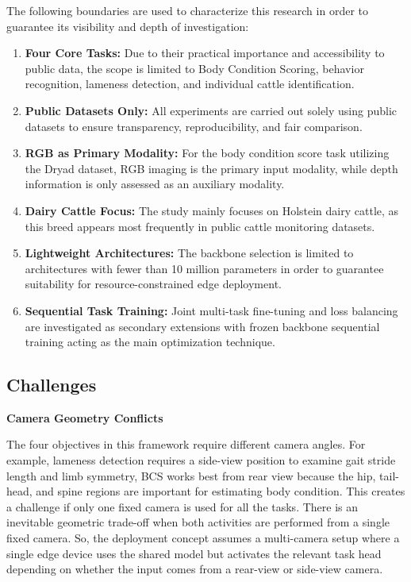 The following boundaries are used to characterize this research in order to guarantee its visibility and depth of investigation:

\begin{enumerate}
    \item \textbf{Four Core Tasks:} Due to their practical importance and accessibility to public data, the scope is limited to Body Condition Scoring, behavior recognition, lameness detection, and individual cattle identification. 
    
    \item \textbf{Public Datasets Only:} All experiments are carried out solely using public datasets to ensure transparency, reproducibility, and fair comparison. 
    
    \item \textbf{RGB as Primary Modality:} For the body condition score task utilizing the Dryad dataset, RGB imaging is the primary input modality, while depth information is only assessed as an auxiliary modality. 
    
    \item \textbf{Dairy Cattle Focus:} The study mainly focuses on Holstein dairy cattle, as this breed appears most frequently in public cattle monitoring datasets. 
    
    \item \textbf{Lightweight Architectures:} The backbone selection is limited to architectures with fewer than 10 million parameters in order to guarantee suitability for resource-constrained edge deployment. 
    
    \item \textbf{Sequential Task Training:} Joint multi-task fine-tuning and loss balancing are investigated as secondary extensions with frozen backbone sequential training acting as the main optimization technique.
\end{enumerate}


\subsection{Challenges}

\textbf{Camera Geometry Conflicts}

The four objectives in this framework require different camera angles. For example, lameness detection requires a side-view position to examine gait stride length and limb symmetry, BCS works best from rear view because the hip, tail-head, and spine regions are important for estimating body condition. This creates a challenge if only one fixed camera is used for all the tasks. There is an inevitable geometric trade-off when both activities are performed from a single fixed camera. So, the deployment concept assumes a multi-camera setup where a single edge device uses the shared model but activates the relevant task head depending on whether the input comes from a rear-view or side-view camera. 



